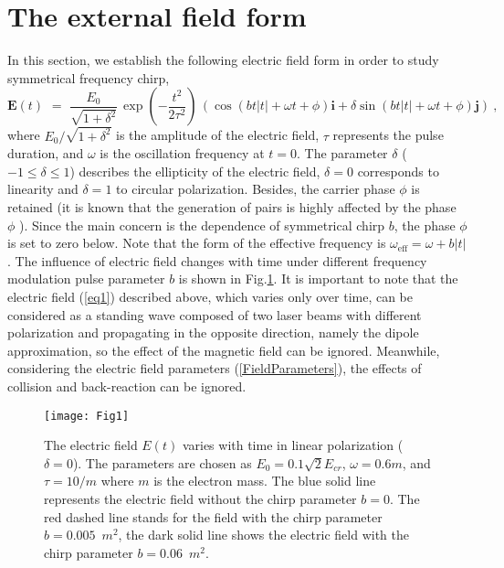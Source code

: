 \documentclass[aps,preprint,superscriptaddress]{revtex4}
\begin{document}
\section{The external field form}\label{field}

In this section, we establish the following electric field form in order to study symmetrical frequency chirp,
\begin{equation}\label{eq1}
\textbf{E}(t) \,\, =\, \, \frac{E_{0}}{\sqrt{1+\delta^{2}}}\,
\exp\left(-\frac{t^2}{2\tau^2}\right) \,
\left(
\cos(b t|t|+\omega t+\phi) \textbf{i}+
\delta\sin(b t|t|+\omega t+\phi)\textbf{j}
\right)\ ,
\end{equation}
where ${E_{0}}/{\sqrt{1+\delta^{2}}}$ is the amplitude of the electric field, $\tau$ represents the pulse duration, and $\omega$ is the oscillation frequency at $t=0$. The parameter $\delta$ ($-1\le \delta \le 1$) describes the ellipticity of the electric field, $\delta=0$ corresponds to linearity and $\delta =1$ to circular polarization. Besides, the carrier phase $\phi$ is retained (it is known that the generation of pairs is highly affected by the phase $\phi $ \cite{Kohlfurst:2015niu,Abdukerim:2013pb}). Since the main concern is the dependence of symmetrical chirp $b$, the phase $\phi$ is set to zero below. Note that the form of the effective frequency is $\omega_{\mathrm{eff}}= \omega + b|t|$. The influence of electric field changes with time under different frequency modulation pulse parameter $b$ is shown in Fig.\ref{fig:1}. It is important to note that the electric field (\ref{eq1}) described above, which varies only over time, can be considered as a standing wave composed of two laser beams with different polarization and propagating in the opposite direction, namely the dipole approximation, so the effect of the magnetic field can be ignored. Meanwhile, considering the electric field parameters (\ref{FieldParameters}), the effects of collision and back-reaction can be ignored.

\begin{figure}[htbp]%
\begin{center}
\texttt{[image: Fig1]}
\vspace{-10mm}
\end{center}
\caption{The electric field $ E (t) $ varies with time in linear polarization ($ \delta = 0 $).
The parameters are chosen as $E_{0}=0.1\sqrt{2}E_{cr}$, $\omega=0.6m$, and $\tau=10/m$
where $m$ is the electron mass.
The blue solid line represents the electric field without the chirp parameter $b=0$.
The red dashed line stands for the field with the chirp parameter $b=0.005$~$m^2$,
the dark solid line shows the electric field with the chirp parameter $b=0.06$~$m^2$.}
\label{fig:1}
\end{figure}
\end{document}
